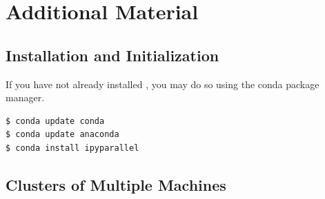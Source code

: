 %
%
%
%

\newpage
\section*{Additional Material}

\subsection*{Installation and Initialization}

If you have not already installed , you may do so using the conda package manager.

\begin{lstlisting}[style=ShellInput]
$ conda update conda
$ conda update anaconda
$ conda install ipyparallel
\end{lstlisting}

\subsection*{Clusters of Multiple Machines}

